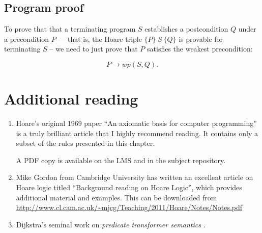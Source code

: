 \subsection{Program proof}

To prove that that a terminating program $S$ establishes a postcondition $Q$  under a precondition $P$
 --- that is, the Hoare triple $\{P\}~S~\{Q\}$ is provable for terminating $S$ --  we need to just prove that $P$ satisfies the weakest precondition:

\begin{displaymath}
P \rightarrow wp(S, Q).
\end{displaymath}

\section{Additional reading}

\begin{enumerate}

 \item Hoare's original 1969 paper ``An axiomatic basis for computer programming'' \cite{hoare69} is a truly brilliant article that I highly recommend reading. It contains only a subset of the rules presented in this chapter.

  A PDF copy is available on the LMS and in the subject repository.

 \item Mike Gordon from Cambridge University has written an excellent article on Hoare logic titled ``Background reading on Hoare Logic'', which provides additional material and examples. This can be downloaded from \url{http://www.cl.cam.ac.uk/~mjcg/Teaching/2011/Hoare/Notes/Notes.pdf}

 \item Dijkstra's seminal work on \emph{predicate transformer semantics} \cite{dijkstra78}. 

\end{enumerate}

